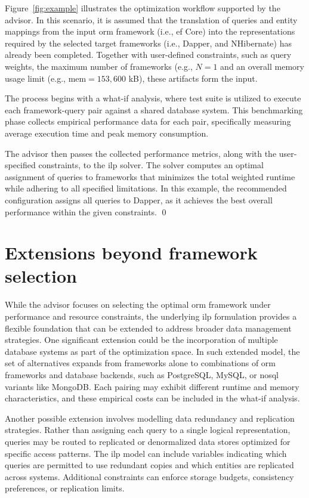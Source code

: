 \begin{example}    
\small
Figure~\ref{fig:example} illustrates the optimization workflow supported by the advisor. In this scenario, it is assumed that the translation of queries and entity mappings from the input \acrshort{orm} framework (i.e., \acrshort{ef} Core) into the representations required by the selected target frameworks (i.e., Dapper, and NHibernate) has already been completed. Together with user-defined constraints, such as query weights, the maximum number of frameworks (e.g., $N = 1$ and an overall memory usage limit (e.g., $\text{mem} = 153,600$ kB), these artifacts form the input.

The process begins with a what-if analysis, where test suite is utilized to execute each framework-query pair against a shared database system. This benchmarking phase collects empirical performance data for each pair, specifically measuring average execution time and peak memory consumption.

The advisor then passes the collected performance metrics, along with the user-specified constraints, to the \acrshort{ilp} solver. The solver computes an optimal assignment of queries to frameworks that minimizes the total weighted runtime while adhering to all specified limitations. In this example, the recommended configuration assigns all queries to Dapper, as it achieves the best overall performance within the given constraints.
\qed
\end{example}

\section{Extensions beyond framework selection}
\label{sec:advisor_extensions}

While the advisor focuses on selecting the optimal \acrshort{orm} framework under performance and resource constraints, the underlying \acrshort{ilp} formulation provides a flexible foundation that can be extended to address broader data management strategies. One significant extension could be the incorporation of multiple database systems as part of the optimization space. In such extended model, the set of alternatives expands from frameworks alone to combinations of \acrshort{orm} frameworks and database backends, such as PostgreSQL, MySQL, or \acrshort{nosql} variants like MongoDB. Each pairing may exhibit different runtime and memory characteristics, and these empirical costs can be included in the what-if analysis.

Another possible extension involves modelling data redundancy and replication strategies. Rather than assigning each query to a single logical representation, queries may be routed to replicated or denormalized data stores optimized for specific access patterns. The \acrshort{ilp} model can include variables indicating which queries are permitted to use redundant copies and which entities are replicated across systems. Additional constraints can enforce storage budgets, consistency preferences, or replication limits.
